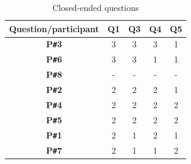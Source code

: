 \begin{table}[!ht]
    \centering
    \begin{tabular}{c|c|c|c|c}
    \hline
    \multicolumn{1}{|c|}{\textbf{Question/participant}} &
    \multicolumn{1}{c|}{\textbf{Q1}} &
    \multicolumn{1}{c|}{\textbf{Q3}} &
    \multicolumn{1}{c|}{\textbf{Q4}} &
    \multicolumn{1}{c|}{\textbf{Q5}} \\ \hline
 
    \multicolumn{1}{|c|}{\textbf{P\texttt{\#}3}} &
    \multicolumn{1}{c|}{3} &
    \multicolumn{1}{c|}{3} &
    \multicolumn{1}{c|}{3} &
    \multicolumn{1}{c|}{1} \\ \hline
    \multicolumn{1}{|c|}{\textbf{P\texttt{\#}6}} &
    \multicolumn{1}{c|}{3} &
    \multicolumn{1}{c|}{3} &
    \multicolumn{1}{c|}{1} &
    \multicolumn{1}{c|}{1} \\ \hline
    \multicolumn{1}{|c|}{\textbf{P\texttt{\#}8}} &
    \multicolumn{1}{c|}{-} &
    \multicolumn{1}{c|}{-} &
    \multicolumn{1}{c|}{-} &
    \multicolumn{1}{c|}{-} \\ \hline
    \multicolumn{1}{|c|}{\textbf{P\texttt{\#}2}} &
    \multicolumn{1}{c|}{2} &
    \multicolumn{1}{c|}{2} &
    \multicolumn{1}{c|}{2} &
    \multicolumn{1}{c|}{1} \\ \hline
    \multicolumn{1}{|c|}{\textbf{P\texttt{\#}4}} &
    \multicolumn{1}{c|}{2} &
    \multicolumn{1}{c|}{2} &
    \multicolumn{1}{c|}{2} &
    \multicolumn{1}{c|}{2} \\ \hline
    \multicolumn{1}{|c|}{\textbf{P\texttt{\#}5}} &
    \multicolumn{1}{c|}{2} &
    \multicolumn{1}{c|}{2} &
    \multicolumn{1}{c|}{2} &
    \multicolumn{1}{c|}{2} \\ \hline
    \multicolumn{1}{|c|}{\textbf{P\texttt{\#}1}} &
    \multicolumn{1}{c|}{2} &
    \multicolumn{1}{c|}{1} &
    \multicolumn{1}{c|}{2} &
    \multicolumn{1}{c|}{1} \\ \hline
    \multicolumn{1}{|c|}{\textbf{P\texttt{\#}7}} &
    \multicolumn{1}{c|}{2} &
    \multicolumn{1}{c|}{1} &
    \multicolumn{1}{c|}{1} &
    \multicolumn{1}{c|}{2} \\ \hline
    \end{tabular}
    \caption{Closed-ended questions}
    \label{tab:closedendedquestions}
\end{table}


